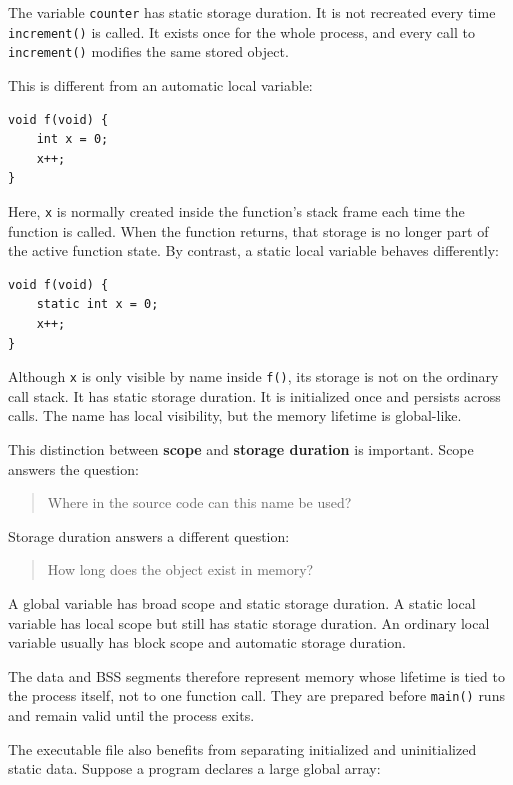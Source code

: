 The variable \texttt{counter} has static storage duration. It is not recreated every time \texttt{increment()} is called. It exists once for the whole process, and every call to \texttt{increment()} modifies the same stored object.

This is different from an automatic local variable:

\begin{verbatim}
void f(void) {
    int x = 0;
    x++;
}
\end{verbatim}

Here, \texttt{x} is normally created inside the function's stack frame each time the function is called. When the function returns, that storage is no longer part of the active function state. By contrast, a static local variable behaves differently:

\begin{verbatim}
void f(void) {
    static int x = 0;
    x++;
}
\end{verbatim}

Although \texttt{x} is only visible by name inside \texttt{f()}, its storage is not on the ordinary call stack. It has static storage duration. It is initialized once and persists across calls. The name has local visibility, but the memory lifetime is global-like.

This distinction between \textbf{scope} and \textbf{storage duration} is important. Scope answers the question:

\begin{quote}
Where in the source code can this name be used?
\end{quote}

Storage duration answers a different question:

\begin{quote}
How long does the object exist in memory?
\end{quote}

A global variable has broad scope and static storage duration. A static local variable has local scope but still has static storage duration. An ordinary local variable usually has block scope and automatic storage duration.

The data and BSS segments therefore represent memory whose lifetime is tied to the process itself, not to one function call. They are prepared before \texttt{main()} runs and remain valid until the process exits.

The executable file also benefits from separating initialized and uninitialized static data. Suppose a program declares a large global array:

